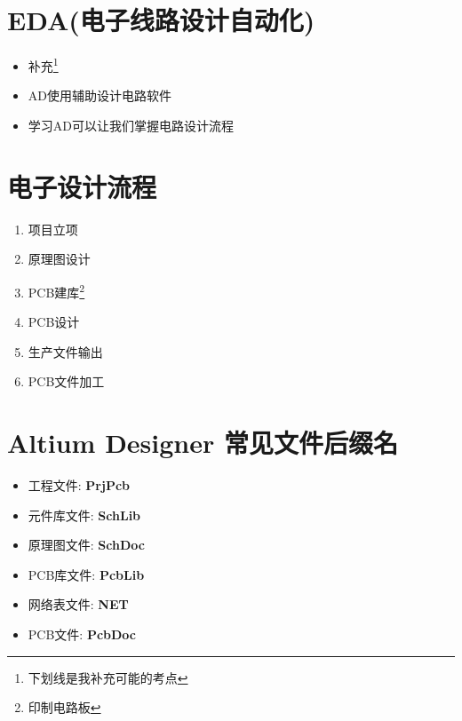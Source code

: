 \documentclass[11pt]{article}
\author{werbinich}
\date{\today}
\title{}
\begin{document}
\tableofcontents

\section{EDA(电子线路设计自动化)}
\label{sec:orga6d6d82}
\begin{itemize}
\item 补充\footnote{下划线是我补充可能的考点}
\item AD使用辅助设计电路软件
\item 学习AD可以让我们掌握电路设计流程
\end{itemize}
\section{电子设计流程}
\label{sec:org5b9dfaf}
\begin{enumerate}
\item 项目立项
\item 原理图设计
\item PCB建库\footnote{印制电路板}
\item PCB设计
\item 生产文件输出
\item PCB文件加工
\end{enumerate}
\section{Altium Designer 常见文件后缀名}
\label{sec:org44a975c}
\begin{itemize}
\item 工程文件: \textbf{PrjPcb}
\item 元件库文件: \textbf{SchLib}
\item 原理图文件: \textbf{SchDoc}
\item PCB库文件: \textbf{PcbLib}
\item 网络表文件: \textbf{NET}
\item PCB文件: \textbf{PcbDoc}
\end{itemize}
\end{document}
